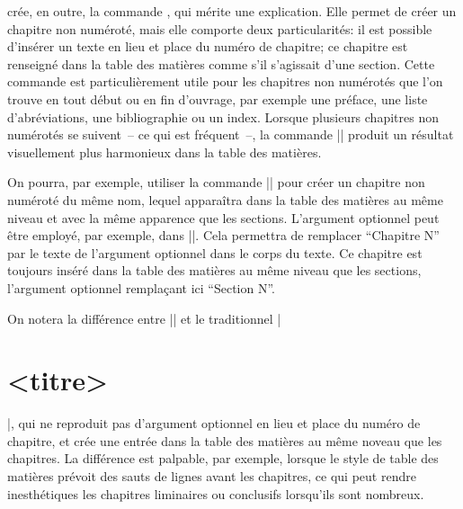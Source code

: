\frenchlaw crée, en outre, la commande , qui mérite une explication. Elle permet de créer un chapitre non numéroté, mais elle comporte deux particularités:  il est possible d'insérer un texte en lieu et place du numéro de chapitre;  ce chapitre est renseigné dans la table des matières comme s'il s'agissait d'une section. Cette commande est particulièrement utile pour les chapitres non numérotés que l'on trouve en tout début ou en fin d'ouvrage, par exemple une préface, une liste d'abréviations, une bibliographie ou un index. Lorsque plusieurs chapitres non numérotés se suivent~-- ce qui est fréquent~--, la commande |\fakechapter| produit un résultat visuellement plus harmonieux dans la table des matières.

\begin{macro}
\end{macro}

On pourra, par exemple, utiliser la commande || pour créer un chapitre non numéroté du même nom, lequel apparaîtra dans la table des matières au même niveau et avec la même apparence que les sections. L'argument optionnel peut être employé, par exemple, dans ||. Cela permettra de remplacer \enquote{Chapitre N} par le texte de l'argument optionnel dans le corps du texte. Ce chapitre est toujours inséré dans la table des matières au même niveau que les sections, l'argument optionnel remplaçant ici \enquote{Section N}.

On notera la différence entre |\fakechapter| et le traditionnel |\chapter*{<titre>}|, qui ne reproduit pas d'argument optionnel en lieu et place du numéro de chapitre, et crée une entrée dans la table des matières au même noveau que les chapitres. La différence est palpable, par exemple, lorsque le style de table des matières prévoit des sauts de lignes avant les chapitres, ce qui peut rendre inesthétiques les chapitres liminaires ou conclusifs lorsqu'ils sont nombreux.

